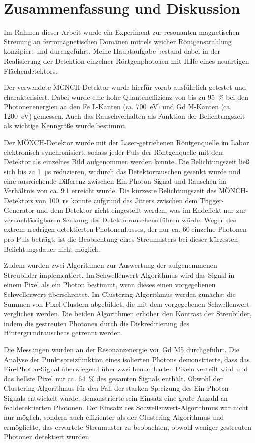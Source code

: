 \chapter{Zusammenfassung und Diskussion}
Im Rahmen dieser Arbeit wurde ein Experiment zur resonanten magnetischen Streuung an ferromagnetischen Domänen mittels weicher Röntgenstrahlung konzipiert und durchgeführt. Meine Hauptaufgabe bestand dabei in der Realisierung der Detektion einzelner Röntgenphotonen mit Hilfe eines neuartigen Flächendetektors.

\noindent
Der verwendete MÖNCH Detektor wurde hierfür vorab ausführlich getestet und charakterisiert. Dabei wurde eine hohe Quanteneffizienz von bis zu \SI{95}{\percent} bei den Photonenenergien an den Fe L-Kanten (ca. \SI{700}{\eV}) und Gd M-Kanten (ca. \SI{1200}{\eV}) gemessen. Auch das Rauschverhalten als Funktion der Belichtungszeit als wichtige Kenngröße wurde bestimmt.

\noindent
Der MÖNCH-Detektor wurde mit der Laser-getriebenen Röntgenquelle im Labor elektronisch synchronisiert, sodass jeder Puls der Röntgenquelle mit dem Detektor als einzelnes Bild aufgenommen werden konnte. Die Belichtungszeit ließ sich bis zu \SI{1}{\micro\second} reduzieren, wodurch das Detektorrauschen gesenkt wurde und eine ausreichende Differenz zwischen Ein-Photon-Signal und Rauschen im Verhältnis von ca. 9:1 erreicht wurde. Die kürzeste Belichtungszeit des MÖNCH-Detektors von \SI{100}{\nano\second} konnte aufgrund des Jitters zwischen dem Trigger-Generator und dem Detektor nicht eingestellt werden, was im Endeffekt nur zur vernachlässigbaren Senkung des Detektorrauschens führen würde. Wegen des extrem niedrigen detektierten Photonenflusses, der nur ca. 60 einzelne Photonen pro Puls beträgt, ist die Beobachtung eines Streumusters bei dieser kürzesten Belichtungsdauer nicht möglich.

\noindent
Zudem wurden zwei Algorithmen zur Auswertung der aufgenommenen Streubilder implementiert. Im Schwellenwert-Algorithmus wird das Signal in einem Pixel als ein Photon bestimmt, wenn dieses einen vorgegebenen Schwellenwert überschreitet. Im Clustering-Algorithmus werden zunächst die Summen von Pixel-Clustern abgebildet, die mit dem vorgegebenen Schwellenwert verglichen werden. Die beiden Algorithmen erhöhen den Kontrast der Streubilder, indem die gestreuten Photonen durch die Diskreditierung des Hintergrundrauschens getrennt werden.

\noindent
Die Messungen wurden an der Resonanzenergie von Gd M5 durchgeführt. Die Analyse der Punktspreizfunktion eines isolierten Photons demonstrierte, dass das Ein-Photon-Signal überwiegend über zwei benachbarten Pixeln verteilt wird und das hellste Pixel nur ca. \SI{64}{\percent} des gesamten Signals enthält. Obwohl der Clustering-Algorithmus für den Fall der starken Spreizung des Ein-Photon-Signals entwickelt wurde, demonstrierte sein Einsatz eine große Anzahl an fehldetektierten Photonen. Der Einsatz des Schwellenwert-Algorithmus war nicht nur möglich, sondern auch effizienter als der Clustering-Algorithmus und ermöglichte, das erwartete Streumuster zu beobachten, obwohl weniger gestreuten Photonen detektiert wurden.  

